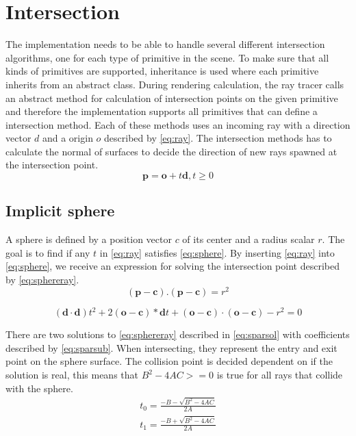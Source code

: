 \documentclass[a4paper, 12pt]{report}
\begin{document}
\section{Intersection}
The implementation needs to be able to handle several different intersection algorithms, one for each type of primitive in the scene.
To make sure that all kinds of primitives are supported, inheritance is used where each primitive inherits from an abstract class.
During rendering calculation, the ray tracer calls an abstract method for calculation of intersection points on the given primitive and therefore the implementation supports all primitives that can define a intersection method.
Each of these methods uses an incoming ray with a direction vector $d$ and a origin $o$ described by \autoref{eq:ray}.
The intersection methods has to calculate the normal of surfaces to decide the direction of new rays spawned at the intersection point.
\begin{equation} \label{eq:ray}
\mathbf{p} = \mathbf{o} + t \mathbf{d}, t \geq 0
\end{equation}

\subsection{Implicit sphere}
A sphere is defined by a position vector $c$ of its center and a radius scalar $r$. 
The goal is to find if any $t$ in \autoref{eq:ray} satisfies \autoref{eq:sphere}. 
By inserting \autoref{eq:ray} into \autoref{eq:sphere}, we receive an expression for solving the intersection point described by \autoref{eq:sphereray}.
\begin{equation} \label{eq:sphere}
(\mathbf{p} - \mathbf{c}).(\mathbf{p} - \mathbf{c}) = r^2
\end{equation}

\begin{equation} \label{eq:sphereray}
(\mathbf{d} \cdot \mathbf{d})t^2 + 2(\mathbf{o} - \mathbf{c}) * \mathbf{d} t + (\mathbf{o} - \mathbf{c}) \cdot (\mathbf{o} - \mathbf{c}) - r^2=0
\end{equation}

There are two solutions to \autoref{eq:sphereray} described in \autoref{eq:sparsol} with coefficients described by \autoref{eq:sparsub}.
When intersecting, they represent the entry and exit point on the sphere surface.
The collision point is decided dependent on if the solution is real, this means that $B^2 - 4 A C >= 0$ is true for all rays that collide with the sphere.
\begin{subequations} \label{eq:sparsol}
\begin{align} 
t_0 = \frac{ -B - \sqrt{B^2 - 4 A C} }{ 2 A }\\
t_1 = \frac{ -B + \sqrt{B^2 - 4 A C} }{ 2 A }
\end{align}
\end{subequations}
\end{document}
